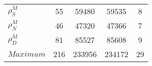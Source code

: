\begin{center}
\begin{longtable}{lcccc}
$ {\rho^{M}_{S}}       $	 & 	                   55	 & 	                59480	 & 	                59535	 & 	                    8 \\ 
$ {\rho^{M}_{N}}       $	 & 	                   46	 & 	                47320	 & 	                47366	 & 	                    7 \\ 
$ {\rho^{M}_{D}}       $	 & 	                   81	 & 	                85527	 & 	                85608	 & 	                    9 \\ 
$Maximum               $	 & 	                  216	 & 	               233956	 & 	               234172	 & 	                   29 \\ 
\end{longtable}
 \end{center}
